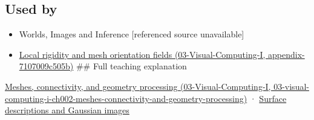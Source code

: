 \subsection{Used by}\label{appendix-0234ab7f86b1-used-by}

\begin{itemize}
\item
  {Worlds, Images and Inference {[}referenced source unavailable{]}}
\item
  \href{../03-Visual-Computing-I/main.pdf\#nameddest=appendix-7107009c505b}{Local rigidity and mesh orientation fields (03-Visual-Computing-I, appendix-7107009c505b)} \#\# Full teaching explanation
\end{itemize}

\href{../03-Visual-Computing-I/main.pdf\#nameddest=03-visual-computing-i-ch002-meshes-connectivity-and-geometry-processing}{Meshes, connectivity, and geometry processing (03-Visual-Computing-I, 03-visual-computing-i-ch002-meshes-connectivity-and-geometry-processing)} · \hyperref[04-visual-computing-ii-ch032-surface-descriptions-and-gaussian-images]{Surface descriptions and Gaussian images}
